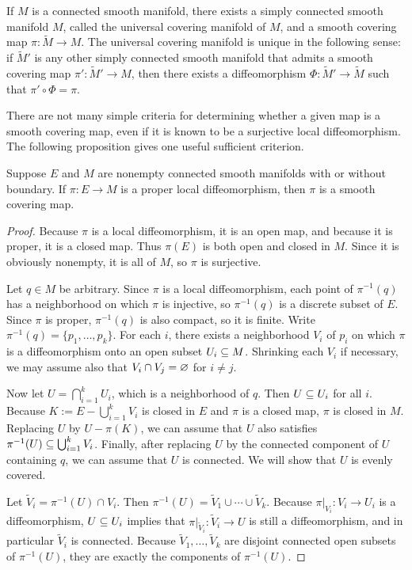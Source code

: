 \begin{corollary}
If $M$ is a connected smooth manifold, there exists a simply connected smooth manifold $M$, called the universal covering manifold of $M$, and a smooth covering map $\pi:\widetilde{M}\to M$. The universal covering manifold is unique in the following sense: if $\widetilde{M}'$ is any other simply connected smooth manifold that admits a smooth covering map $\pi':\widetilde{M}'\to M$, then there exists a diffeomorphism $\varPhi:\widetilde{M}'\to \widetilde{M}$ such that  $\pi'\circ\varPhi=\pi$.
\end{corollary}
There are not many simple criteria for determining whether a given map is a smooth covering map, even if it is known to be a surjective local diffeomorphism.
The following proposition gives one useful sufficient criterion.
\begin{proposition}\label{smooth covering if proper}
Suppose $E$ and $M$ are nonempty connected smooth manifolds with or without boundary. If $\pi:E\to M$ is a proper local diffeomorphism, then $\pi$ is a smooth covering map.
\end{proposition}
\begin{proof}
Because $\pi$ is a local diffeomorphism, it is an open map, and because it is proper, it is a closed map. Thus $\pi(E)$ is both open and closed in $M$. Since it is obviously nonempty, it is all of $M$, so $\pi$ is surjective.\par
Let $q\in M$ be arbitrary. Since $\pi$ is a local diffeomorphism, each point of $\pi^{-1}(q)$ has a neighborhood on which $\pi$ is injective, so $\pi^{-1}(q)$ is a discrete subset of $E$. Since $\pi$ is proper, $\pi^{-1}(q)$ is also compact, so it is finite. Write $\pi^{-1}(q)=\{p_1,\dots,p_k\}$. For each $i$, there exists a neighborhood $V_i$ of $p_i$ on which $\pi$ is a diffeomorphism onto an open subset $U_i\subseteq M$. Shrinking each $V_i$ if necessary, we may assume also that $V_i\cap V_j=\varnothing$ for $i\neq j$.\par
Now let $U=\bigcap_{i=1}^{k}U_i$, which is a neighborhood of $q$. Then $U\subseteq U_i$ for all $i$. Because $K:=E-\bigcup_{i=1}^{k}V_i$ is closed in $E$ and $\pi$ is a closed map, $\pi$ is closed in $M$. Replacing $U$ by $U-\pi(K)$, we can assume that $U$ also satisfies $\pi^{-1}(U)\subseteq\bigcup_{i=1}^{k}V_i$. Finally, after replacing $U$ by the connected component of $U$ containing $q$, we can assume that $U$ is connected. We will show that $U$ is evenly covered.\par
Let $\widetilde{V}_i=\pi^{-1}(U)\cap V_i$. Then $\pi^{-1}(U)=\widetilde{V}_1\cup\cdots\cup\widetilde{V}_k$. Because $\pi|_{V_i}:V_i\to U_i$ is a diffeomorphism, $U\subseteq U_i$ implies that $\pi|_{\widetilde{V}_i}:\widetilde{V}_i\to U$ is still a diffeomorphism, and in particular $\widetilde{V}_i$ is connected. Because $\widetilde{V}_1,\dots,\widetilde{V}_k$ are disjoint connected open subsets of $\pi^{-1}(U)$, they are exactly the components of $\pi^{-1}(U)$.
\end{proof}
